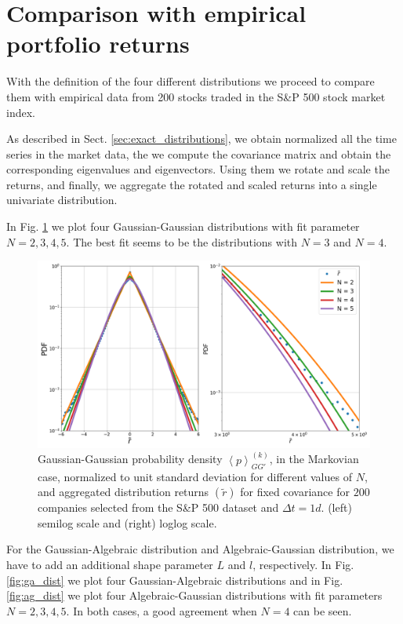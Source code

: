 \section{Comparison with empirical portfolio returns}
\label{sec:comparison_returns}

With the definition of the four different distributions we proceed to compare
them with empirical data from 200 stocks traded in the S\&P 500 stock market
index.

As described in Sect. \ref{sec:exact_distributions}, we obtain normalized all
the time series in the market data, the we compute the covariance matrix and
obtain the corresponding eigenvalues and eigenvectors. Using them we rotate and
scale the returns, and finally, we aggregate the rotated and scaled returns
into a single univariate distribution.

In Fig. \ref{fig:gg_dist} we plot four Gaussian-Gaussian distributions with
fit parameter $N = 2, 3, 4, 5$. The best fit seems to be the distributions
with $N = 3$ and $N = 4$.

\begin{figure}[htbp]
    \centering
    \includegraphics[width=0.7\columnwidth]
    {figures/08_gg.png}
    \caption{Gaussian-Gaussian probability density
             $\left\langle p \right\rangle_{GG'}^{\left(k\right)}$, in the
             Markovian case, normalized to unit standard deviation for
             different values of $N$, and aggregated distribution returns
             $\left(\tilde{r}\right)$ for fixed covariance for $200$ companies
             selected from the S\&P 500 dataset and $\Delta t = 1d$. (left)
             semilog scale and (right) loglog scale.}
    \label{fig:gg_dist}
\end{figure}

For the Gaussian-Algebraic distribution and Algebraic-Gaussian distribution,
we have to add an additional shape parameter $L$ and $l$, respectively. In
Fig. \ref{fig:ga_dist} we plot four Gaussian-Algebraic distributions and in
Fig. \ref{fig:ag_dist} we plot four Algebraic-Gaussian distributions with fit
parameters $N = 2, 3, 4, 5$. In both cases, a good agreement when $N = 4$ can
be seen.

